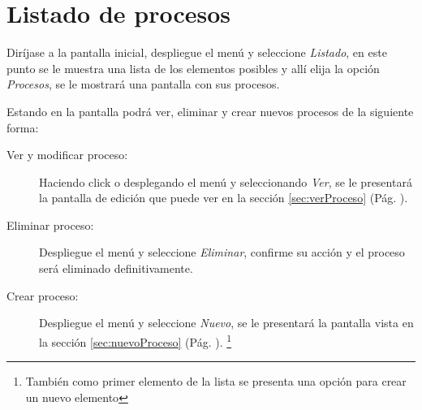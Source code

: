 \section{Listado de procesos}
\label{sec:listadoProcesos}
Dir\'ijase a la pantalla inicial, despliegue el men\'u \blackberry y seleccione
\emph{Listado}, en este punto se le muestra una lista de los elementos posibles
y all\'i elija la opci\'on \emph{Procesos}, se le mostrar\'a una
pantalla con sus procesos.

Estando en la pantalla podr\'a ver, eliminar y crear nuevos procesos de la
siguiente forma:

\begin{description}
\item[Ver y modificar proceso:]Haciendo click o desplegando el men\'u
\blackberry y seleccionando \emph{Ver}, se le presentar\'a la pantalla de
edici\'on que puede ver en la secci\'on \ref{sec:verProceso} (P\'ag.
\pageref{sec:verProceso}).
\item[Eliminar proceso:]Despliegue el men\'u \blackberry y seleccione
\emph{Eliminar}, confirme su acci\'on y el proceso ser\'a eliminado
definitivamente.
\item[Crear proceso:]Despliegue el men\'u \blackberry y seleccione
\emph{Nuevo}, se le presentar\'a la pantalla vista en la
secci\'on \ref{sec:nuevoProceso} (P\'ag. \pageref{sec:nuevoJuzgado}).
\footnote{Tambi\'en como primer elemento de la lista se presenta una opci\'on
para crear un nuevo elemento}
\end{description}
